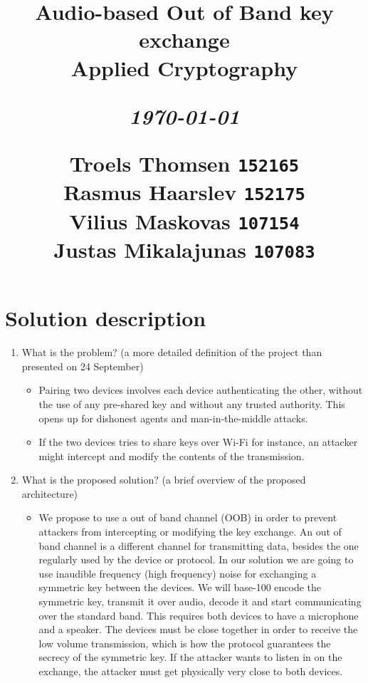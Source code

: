\documentclass[12pt]{article}
\title{
  \vspace{4cm}
  \begin{flushleft}
  \Large{\textbf{Audio-based Out of Band key exchange}} \\
  \large{Applied Cryptography}
  \end{flushleft}
  \vspace{0cm}
  \begin{flushleft}
  \small
  \textit{\today}
  \end{flushleft}
  \vspace{12cm}
  \begin{flushleft}
  \small
  Troels Thomsen \texttt{152165} \\
  Rasmus Haarslev \texttt{152175} \\
  Vilius Maskovas \texttt{107154} \\
  Justas Mikalajunas \texttt{107083}\\
  \end{flushleft}
}
\date{
}
\begin{document}
\clearpage
{}
\thispagestyle{empty}
\maketitle

\newpage

\tableofcontents

\newpage


\section{Solution description}
\label{sec:Solution description}

\begin{enumerate}
    \item What is the problem?  (a more detailed definition of the project than presented on 24 September)

    \begin{itemize}
        \item Pairing two devices involves each device authenticating the other, without the use of any pre-shared key and without any trusted authority. This opens up for dishonest agents and man-in-the-middle attacks.
        \item If the two devices tries to share keys over Wi-Fi for instance, an attacker might intercept and modify the contents of the transmission.
    \end{itemize}

    \item What is the proposed solution? (a brief overview of the proposed architecture)

    \begin{itemize}
        \item We propose to use a out of band channel (OOB) in order to prevent attackers from intercepting or modifying the key exchange. An out of band channel is a different channel for transmitting data, besides the one regularly used by the device or protocol. In our solution we are going to use inaudible frequency (high frequency) noise for exchanging a symmetric key between the devices.
        We will base-100 encode the symmetric key, transmit it over audio, decode it and start communicating over the standard band.
        This requires both devices to have a microphone and a speaker.
        The devices must be close together in order to receive the low volume transmission, which is how the protocol guarantees the secrecy of the symmetric key. If the attacker wants to listen in on the exchange, the attacker must get physically very close to both devices.
    \end{itemize}


\end{enumerate}
\end{document}
